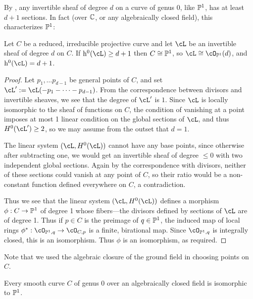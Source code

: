 

By \trr, any invertible sheaf of degree $d$ on a curve of genus 0, like $\PP^1$, has at least $d+1$ sections. In fact (over $\CC$, or any algebraically
closed field), this characterizes $\PP^1$:

\begin{theorem}\label{characterization of P1}
Let $C$ be a reduced, irreducible projective curve and let $\cL$ be an invertible sheaf of degree $d$ on $C$. If $\h^0(\cL) \geq d+1$ then
$C \cong \PP^1$, so $\cL \cong \cO_{\PP^1}(d)$, and $\h^0(\cL) = d+1$. 
\end{theorem}

\begin{proof}
Let $p_1,\dots p_{d-1}$ be general points of $C$, and set $\cL':=\cL(-p_1-\cdots-p_{d-1})$. From the correspondence between divisors and
invertible sheaves, we see that the degree of $\cL'$ is $1$.
 Since $\cL$ is locally isomorphic to the sheaf of functions on $C$, the condition of vanishing at a point imposes at most 1 linear condition on 
the global sections of $\cL$, and thus $H^0(\cL') \geq 2$, so we may assume from the outset that $d =1$.

The linear system $(\cL, H^0(\cL))$ cannot have any base points, since
otherwise after subtracting one, we would get an invertible sheaf of degree $\leq 0$ with two independent global sections. Again by the correspondence
with divisors, neither of these sections could vanish at any point of $C$, so their ratio would be a non-constant function defined everywhere on $C$,
a contradiction.

Thus we see that the linear system $(\cL, H^0(\cL))$ defines a morphism $\phi: C\to \PP^1$ of degree 1 whose fibers---the divisors defined by
sections of $\cL$ are of degree 1. Thus if $p\in C$ is the preimage of $q\in \PP^1$, the induced map of local rings
$\phi^*:\cO_{\PP^1, q} \to \cO_{C, p}$ is a finite, birational map. Since $\cO_{\PP^1, q}$ is integrally closed, this is an isomorphism. Thus 
$\phi$ is an isomorphism, as required. 
 \end{proof}

Note that we used the algebraic closure of the ground field in choosing points on $C$.


\begin{corollary}
 Every smooth curve $C$ of genus 0 over an algebraically closed field is isomorphic to $\PP^1$.
\end{corollary}

